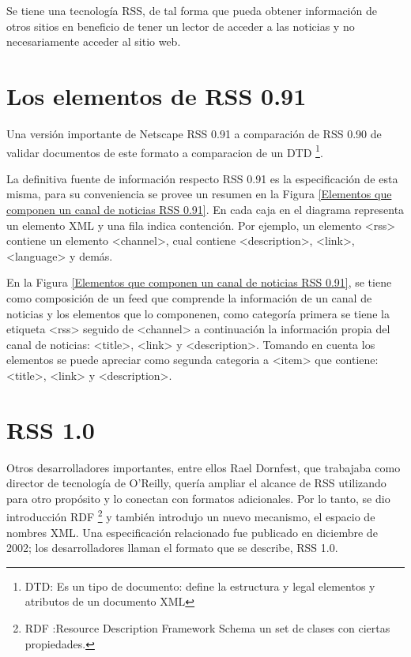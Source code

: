 Se tiene una tecnolog\'{i}a RSS, de tal forma que pueda obtener informaci\'{o}n de
otros sitios en beneficio de tener un lector de acceder a las noticias y no necesariamente
acceder al sitio web.

\section{Los elementos de RSS 0.91}

Una versi\'{o}n importante de Netscape RSS 0.91 a comparaci\'{o}n de RSS 0.90 de
validar documentos de este formato a comparacion de un DTD \footnote{DTD: Es un 
tipo de documento: define la estructura y legal elementos y atributos de un documento XML}. 

La definitiva fuente de informaci\'{o}n respecto RSS 0.91 es la especificación de
esta misma, para su conveniencia se provee un resumen en la Figura \ref{Elementos
que componen un canal de noticias RSS 0.91}. En cada caja en el diagrama
representa un elemento XML y una fila indica contenci\'{o}n. Por ejemplo, un elemento
<rss> contiene un elemento <channel>, cual contiene <description>, <link>, <language> y dem\'{a}s.
\cite{johnson2006rss}

En la Figura \ref{Elementos que componen un canal de noticias RSS 0.91}, se tiene como
composici\'{o}n de un feed que comprende la informaci\'{o}n de un canal de noticias y
los elementos que lo componenen, como categor\'{i}a primera se tiene la etiqueta <rss>
seguido de <channel> a continuaci\'{o}n la informaci\'{o}n propia del canal de noticias:
<title>, <link> y <description>. Tomando en cuenta los elementos se puede apreciar como
segunda categoria a <item> que contiene: <title>, <link> y <description>.   

\begin{minipage}{1.0\textwidth}
	\centering
	\label{Elementos que componen un canal de noticias RSS 0.91}
\end{minipage}


\section{RSS 1.0}

Otros desarrolladores importantes, entre ellos Rael Dornfest, que 
trabajaba como director de tecnolog\'{i}a de O'Reilly, quer\'{i}a ampliar el 
alcance de RSS utilizando para otro prop\'{o}sito y lo conectan con formatos
adicionales. Por lo tanto, se dio introducci\'{o}n RDF \footnote{RDF :Resource
Description Framework Schema un set de clases con ciertas propiedades.} y 
tambi\'{e}n introdujo un nuevo mecanismo, el espacio de nombres XML. Una 
especificaci\'{o}n relacionado fue publicado en diciembre de 2002; los 
desarrolladores llaman el formato que se describe, RSS 1.0.\cite{johnson2006rss}

